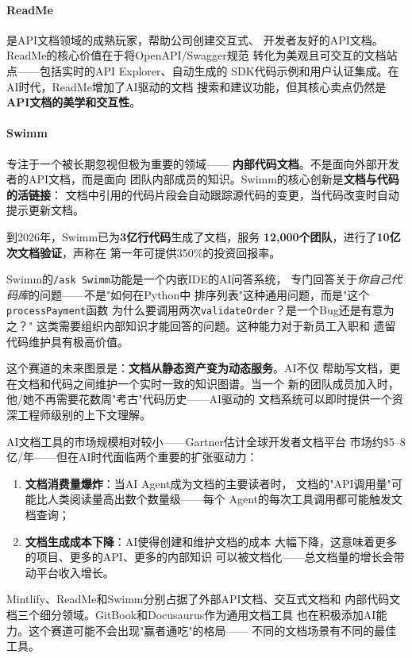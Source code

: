 \paragraph{ReadMe}是API文档领域的成熟玩家，帮助公司创建交互式、
开发者友好的API文档。ReadMe的核心价值在于将OpenAPI/Swagger规范
转化为美观且可交互的文档站点——包括实时的API Explorer、自动生成的
SDK代码示例和用户认证集成。在AI时代，ReadMe增加了AI驱动的文档
搜索和建议功能，但其核心卖点仍然是\textbf{API文档的美学和交互性}。

\paragraph{Swimm}专注于一个被长期忽视但极为重要的领域——
\textbf{内部代码文档}。不是面向外部开发者的API文档，而是面向
团队内部成员的知识。Swimm的核心创新是\textbf{文档与代码的活链接}：
文档中引用的代码片段会自动跟踪源代码的变更，当代码改变时自动
提示更新文档。

到2026年，Swimm已为\textbf{3亿行代码}生成了文档，服务
\textbf{12,000个团队}，进行了\textbf{10亿次文档验证}，声称在
第一年可提供350\%的投资回报率。

Swimm的\texttt{/ask Swimm}功能是一个内嵌IDE的AI问答系统，
专门回答关于\textit{你自己代码库}的问题——不是"如何在Python中
排序列表"这种通用问题，而是"这个\texttt{processPayment}函数
为什么要调用两次\texttt{validateOrder}？是一个Bug还是有意为之？"
这类需要组织内部知识才能回答的问题。这种能力对于新员工入职和
遗留代码维护具有极高价值。

这个赛道的未来图景是：\textbf{文档从静态资产变为动态服务}。AI不仅
帮助写文档，更在文档和代码之间维护一个实时一致的知识图谱。当一个
新的团队成员加入时，他/她不再需要花数周"考古"代码历史——AI驱动的
文档系统可以即时提供一个资深工程师级别的上下文理解。

\begin{corebox}[AI文档赛道的市场规模与竞争格局]
AI文档工具的市场规模相对较小——Gartner估计全球开发者文档平台
市场约\$5--8亿/年——但在AI时代面临两个重要的扩张驱动力：
\begin{enumerate}
  \item \textbf{文档消费量爆炸}：当AI Agent成为文档的主要读者时，
    文档的"API调用量"可能比人类阅读量高出数个数量级——每个
    Agent的每次工具调用都可能触发文档查询；
  \item \textbf{文档生成成本下降}：AI使得创建和维护文档的成本
    大幅下降，这意味着更多的项目、更多的API、更多的内部知识
    可以被文档化——总文档量的增长会带动平台收入增长。
\end{enumerate}
Mintlify、ReadMe和Swimm分别占据了外部API文档、交互式文档和
内部代码文档三个细分领域。GitBook和Docusaurus作为通用文档工具
也在积极添加AI能力。这个赛道可能不会出现"赢者通吃"的格局——
不同的文档场景有不同的最佳工具。
\end{corebox}


